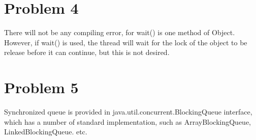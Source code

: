 \documentclass[a4paper, 11pt]{report}
\begin{document}
\section{Problem 4}
There will not be any compiling error, for wait() is one method of Object. However, if wait() is used, the thread will wait for the lock of the 
object to be release before it can continue, but this is not desired.
\section{Problem 5}
Synchronized queue is provided in java.util.concurrent.BlockingQueue interface, which has a number of standard implementation, such as 
ArrayBlockingQueue, LinkedBlockingQueue. etc.
\end{document}
